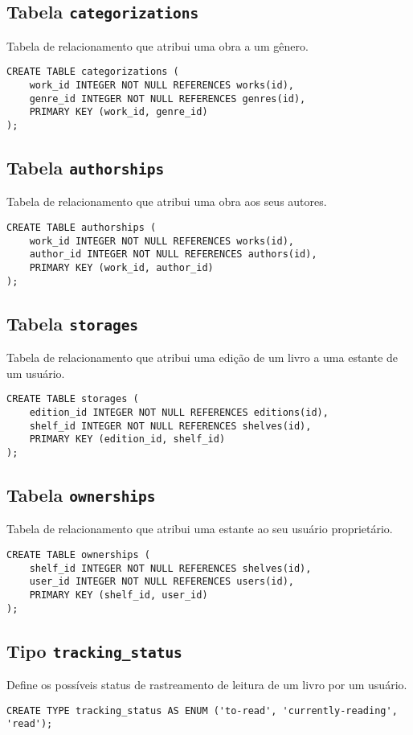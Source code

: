 \documentclass[12pt]{article}
\begin{document}
\subsection{Tabela \texttt{categorizations}}
Tabela de relacionamento que atribui uma obra a um gênero.
\begin{lstlisting}
CREATE TABLE categorizations (
    work_id INTEGER NOT NULL REFERENCES works(id),
    genre_id INTEGER NOT NULL REFERENCES genres(id),
    PRIMARY KEY (work_id, genre_id)
);
\end{lstlisting}

\subsection{Tabela \texttt{authorships}}
Tabela de relacionamento que atribui uma obra aos seus autores.
\begin{lstlisting}
CREATE TABLE authorships (
    work_id INTEGER NOT NULL REFERENCES works(id),
    author_id INTEGER NOT NULL REFERENCES authors(id),
    PRIMARY KEY (work_id, author_id)
);
\end{lstlisting}

\newpage

\subsection{Tabela \texttt{storages}}
Tabela de relacionamento que atribui uma edição de um livro a uma estante de um usuário.
\begin{lstlisting}
CREATE TABLE storages (
    edition_id INTEGER NOT NULL REFERENCES editions(id),
    shelf_id INTEGER NOT NULL REFERENCES shelves(id),
    PRIMARY KEY (edition_id, shelf_id)
);
\end{lstlisting}

\subsection{Tabela \texttt{ownerships}}
Tabela de relacionamento que atribui uma estante ao seu usuário proprietário.
\begin{lstlisting}
CREATE TABLE ownerships (
    shelf_id INTEGER NOT NULL REFERENCES shelves(id),
    user_id INTEGER NOT NULL REFERENCES users(id),
    PRIMARY KEY (shelf_id, user_id)
);
\end{lstlisting}

\subsection{Tipo \texttt{tracking\_status}}
Define os possíveis status de rastreamento de leitura de um livro por um usuário.
\begin{lstlisting}
CREATE TYPE tracking_status AS ENUM ('to-read', 'currently-reading', 'read');
\end{lstlisting}
\end{document}
